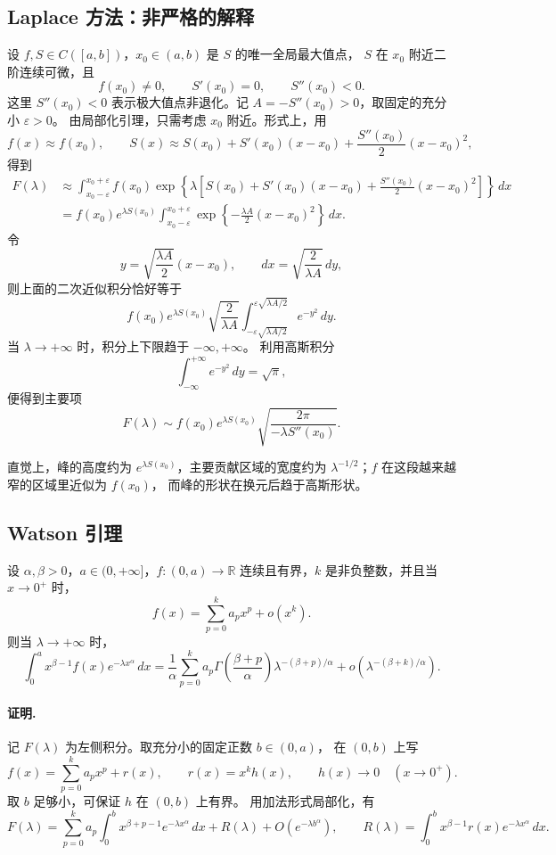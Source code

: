 \documentclass[11pt,a4paper]{ctexart}
\begin{document}
\subsection*{Laplace 方法：非严格的解释}
设 $f,S\in C([a,b])$，$x_0\in(a,b)$ 是 $S$ 的唯一全局最大值点，
$S$ 在 $x_0$ 附近二阶连续可微，且
\[
 f(x_0)\ne0,\qquad S'(x_0)=0,\qquad S''(x_0)<0.
\]
这里 $S''(x_0)<0$ 表示极大值点非退化。记
$A=-S''(x_0)>0$，取固定的充分小 $\varepsilon>0$。
由局部化引理，只需考虑 $x_0$ 附近。形式上，用
\[
 f(x)\approx f(x_0),\qquad
 S(x)\approx S(x_0)+S'(x_0)(x-x_0)
             +\frac{S''(x_0)}2(x-x_0)^2,
\]
得到
\begin{align*}
 F(\lambda)
 &\approx\int_{x_0-\varepsilon}^{x_0+\varepsilon}
 f(x_0)\exp\!\left\{\lambda\left[
 S(x_0)+S'(x_0)(x-x_0)+\frac{S''(x_0)}2(x-x_0)^2
 \right]\right\}\,dx\\
 &=f(x_0)e^{\lambda S(x_0)}
 \int_{x_0-\varepsilon}^{x_0+\varepsilon}
 \exp\!\left\{-\frac{\lambda A}{2}(x-x_0)^2\right\}\,dx.
\end{align*}
令
\[
 y=\sqrt{\frac{\lambda A}{2}}(x-x_0),
 \qquad dx=\sqrt{\frac{2}{\lambda A}}\,dy,
\]
则上面的二次近似积分恰好等于
\[
 f(x_0)e^{\lambda S(x_0)}\sqrt{\frac{2}{\lambda A}}
 \int_{-\varepsilon\sqrt{\lambda A/2}}^{\varepsilon\sqrt{\lambda A/2}}
 e^{-y^2}\,dy.
\]
当 $\lambda\to+\infty$ 时，积分上下限趋于 $-\infty,+\infty$。
利用高斯积分
\[
 \int_{-\infty}^{+\infty}e^{-y^2}\,dy=\sqrt\pi,
\]
便得到主要项
\[
 \boxed{
 F(\lambda)\sim
 f(x_0)e^{\lambda S(x_0)}
 \sqrt{\frac{2\pi}{-\lambda S''(x_0)}}.
 }
\]

直觉上，峰的高度约为 $e^{\lambda S(x_0)}$，主要贡献区域的宽度约为
$\lambda^{-1/2}$；$f$ 在这段越来越窄的区域里近似为 $f(x_0)$，
而峰的形状在换元后趋于高斯形状。

\subsection*{Watson 引理}
设 $\alpha,\beta>0$，$a\in(0,+\infty]$，$f:(0,a)\to\mathbb R$
连续且有界，$k$ 是非负整数，并且当 $x\to0^+$ 时，
\[
 f(x)=\sum_{p=0}^k a_px^p+o(x^k).
\]
则当 $\lambda\to+\infty$ 时，
\[
 \boxed{
 \int_0^a x^{\beta-1}f(x)e^{-\lambda x^\alpha}\,dx
 =\frac1\alpha\sum_{p=0}^k
 a_p\Gamma\!\left(\frac{\beta+p}{\alpha}\right)
 \lambda^{-(\beta+p)/\alpha}
 +o\!\left(\lambda^{-(\beta+k)/\alpha}\right).
 }
\]

\paragraph{证明.}
记 $F(\lambda)$ 为左侧积分。取充分小的固定正数 $b\in(0,a)$，
在 $(0,b)$ 上写
\[
 f(x)=\sum_{p=0}^k a_px^p+r(x),\qquad
 r(x)=x^kh(x),\qquad h(x)\longrightarrow0\quad(x\to0^+).
\]
取 $b$ 足够小，可保证 $h$ 在 $(0,b)$ 上有界。
用加法形式局部化，有
\[
 F(\lambda)=\sum_{p=0}^k a_p
 \int_0^b x^{\beta+p-1}e^{-\lambda x^\alpha}\,dx
 +R(\lambda)+O(e^{-\lambda b^\alpha}),
 \qquad
 R(\lambda)=\int_0^b x^{\beta-1}r(x)e^{-\lambda x^\alpha}\,dx.
\]
\end{document}
